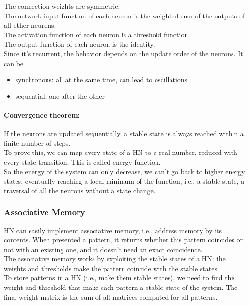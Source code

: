 The connection weights are symmetric. \\
The network input function of each neuron is the weighted sum of the outputs of all other neurons. \\
The activation function of each neuron is a threshold function.\\
The output function of each neuron is the identity.\\

Since it's recurrent, the behavior depends on the update order of the neurons. It can be
\begin{itemize}
	\item synchronous: all at the same time, can lead to oscillations
	\item sequential: one after the other
\end{itemize}

\paragraph{Convergence theorem:} If the neurons are updated sequentially, a stable state is always reached within a finite number of steps.\\
To prove this, we can map every state of a HN to a real number, reduced with every state transition. This is called energy function.\\
So the energy of the system can only decrease, we can't go back to higher energy states, eventually reaching a local minimum of the function, i.e., a stable state, a traversal of all the neurons without a state change.

\subsubsection{Associative Memory}
HN can easily implement associative memory, i.e., address memory by its contents. When presented a pattern, it returns whether this pattern coincides or not with an existing one, and it doesn't need an exact coincidence.\\

The associative memory works by exploiting the stable states of a HN: the weights and thresholds make the pattern coincide with the stable states.\\

To store patterns in a HN (i.e., make them stable states), we need to find the weight and threshold that make each pattern a stable state of the system. The final weight matrix is the sum of all matrices computed for all patterns.\\

